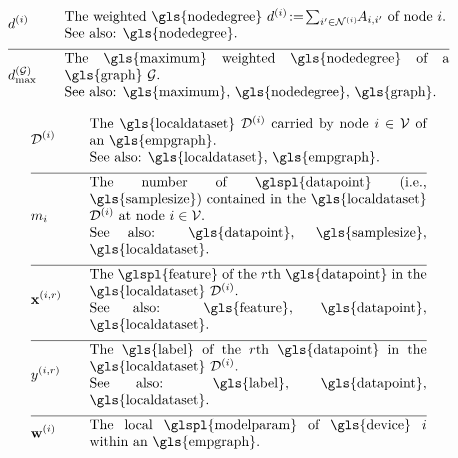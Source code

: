\begin{align}
	&\nodedegree{\nodeidx} & \quad & \parbox{.80\textwidth}{The weighted \gls{nodedegree} 
		$\nodedegree{\nodeidx}\!\defeq\!\sum_{\nodeidx' \in \neighbourhood{\nodeidx}}\hspace*{-1mm} \edgeweight_{\nodeidx,\nodeidx'}$ of node $\nodeidx$. 
		\\ See also: \gls{nodedegree}. }  \nonumber \\[2mm] \hline \nonumber\\[-5mm]
	&\maxnodedegree^{(\graph)} & \quad & \parbox{.80\textwidth}{The \gls{maximum} weighted \gls{nodedegree} of a \gls{graph} $\graph$.
		\\ See also: \gls{maximum}, \gls{nodedegree}, \gls{graph}. } \nonumber 
\end{align} 

\begin{align} 
	&\localdataset{\nodeidx} & \quad & \parbox{.70\textwidth}{The \gls{localdataset} $\localdataset{\nodeidx}$ carried by 
		node $\nodeidx\in \nodes$ of an \gls{empgraph}.
		\\ See also: \gls{localdataset}, \gls{empgraph}. } \nonumber \\[2mm] \hline \nonumber\\[-5mm] 
	&\localsamplesize{\nodeidx} & \quad & \parbox{.70\textwidth}{The number of \glspl{datapoint} (i.e., \gls{samplesize}) contained in the 
		\gls{localdataset} $\localdataset{\nodeidx}$ at node $\nodeidx\in \nodes$.
		\\ See also: \gls{datapoint}, \gls{samplesize}, \gls{localdataset}. } \nonumber \\[2mm] \hline \nonumber\\[-5mm]
	&\featurevec^{(\nodeidx,\sampleidx)} & \quad & \parbox{.70\textwidth}{The \glspl{feature} of the $\sampleidx$th \gls{datapoint} in 
		the \gls{localdataset} $\localdataset{\nodeidx}$.
		\\ See also: \gls{feature}, \gls{datapoint}, \gls{localdataset}. } \nonumber \\[2mm] \hline \nonumber\\[-5mm]
	&\truelabel^{(\nodeidx,\sampleidx)} & \quad & \parbox{.70\textwidth}{The \gls{label} of the $\sampleidx$th \gls{datapoint} in 
		the \gls{localdataset} $\localdataset{\nodeidx}$.
		\\ See also: \gls{label}, \gls{datapoint}, \gls{localdataset}. } \nonumber \\[2mm] \hline \nonumber\\[-5mm]
	&\localparams{\nodeidx} & \quad & \parbox{.70\textwidth}{The local \glspl{modelparam} of \gls{device} $\nodeidx$ within an \gls{empgraph}.
}
\end{align}
